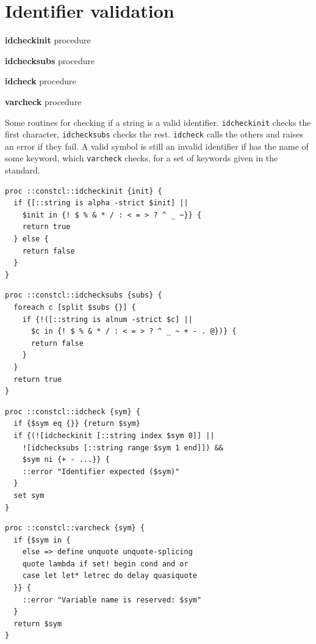 \documentclass[twoside]{report}
\begin{document}
\chapter{Identifier validation}
\label{identifier-validation}

\textbf{idcheckinit} procedure

\noindent \textbf{idchecksubs} procedure

\noindent \textbf{idcheck} procedure

\noindent \textbf{varcheck} procedure

Some routines for checking if a string is a valid identifier. \texttt{idcheckinit} checks the first character, \texttt{idchecksubs} checks the rest. \texttt{idcheck} calls the others and raises an error if they fail. A valid symbol is still an invalid identifier if has the name of some keyword, which \texttt{varcheck} checks, for a set of keywords given in the standard.

\begin{lstlisting}
proc ::constcl::idcheckinit {init} {
  if {[::string is alpha -strict $init] ||
    $init in {! $ % & * / : < = > ? ^ _ ~}} {
    return true
  } else {
    return false
  }
}
\end{lstlisting}

\begin{lstlisting}
proc ::constcl::idchecksubs {subs} {
  foreach c [split $subs {}] {
    if {!([::string is alnum -strict $c] ||
      $c in {! $ % & * / : < = > ? ^ _ ~ + - . @})} {
      return false
    }
  }
  return true
}
\end{lstlisting}

\begin{lstlisting}
proc ::constcl::idcheck {sym} {
  if {$sym eq {}} {return $sym}
  if {(![idcheckinit [::string index $sym 0]] ||
    ![idchecksubs [::string range $sym 1 end]]) &&
    $sym ni {+ - ...}} {
    ::error "Identifier expected ($sym)"
  }
  set sym
}
\end{lstlisting}

\begin{lstlisting}
proc ::constcl::varcheck {sym} {
  if {$sym in {
    else => define unquote unquote-splicing
    quote lambda if set! begin cond and or
    case let let* letrec do delay quasiquote
  }} {
    ::error "Variable name is reserved: $sym"
  }
  return $sym
}
\end{lstlisting}
\end{document}
